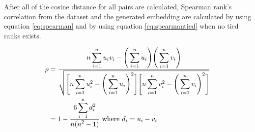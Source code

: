         After all of the cosine distance for all pairs are calculated,
        Spearman rank's correlation from the dataset and the generated
        embedding are calculated by using equation \ref{eq:spearman}
        and by using equation \ref{eq:spearmantied} when no tied ranks
        exists.
        
        \begin{align}
            \label{eq:spearman}
            \rho    &= \frac{\displaystyle n\sum_{i=1}^n u_i v_i - \Bigg( \sum_{i=1}^n u_i \Bigg) \Bigg( \sum_{i=1}^n v_i \Bigg)}{\displaystyle \sqrt{\Bigg[ n \sum_{i=1}^n u_i^2 - \Bigg( \sum_{i=1}^n u_i \Bigg)^2 \Bigg] \Bigg[ n \sum_{i=1}^n v_i^2 - \Bigg( \sum_{i=1}^n v_i \Bigg)^2 \Bigg] }}\\
            \label{eq:spearmantied}            
                    &= 1 - \frac{\displaystyle 6 \sum_{i=1}^n d_i^2}{\displaystyle n(n^2 - 1)}\ \text{where}\ d_i = u_i - v_i
        \end{align}
